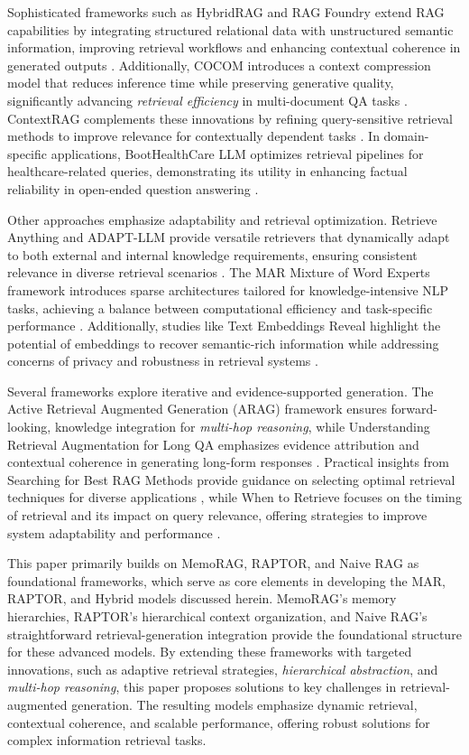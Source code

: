 \documentclass[pdflatex,sn-mathphys-num]{sn-jnl}%
\begin{document}
Sophisticated frameworks such as HybridRAG and RAG Foundry extend RAG capabilities by integrating structured relational data with unstructured semantic information, improving retrieval workflows and enhancing contextual coherence in generated outputs \cite{bib10, bib11}. Additionally, COCOM introduces a context compression model that reduces inference time while preserving generative quality, significantly advancing \emph{retrieval efficiency} in multi-document QA tasks \cite{bib12}. ContextRAG complements these innovations by refining query-sensitive retrieval methods to improve relevance for contextually dependent tasks \cite{bib13}. In domain-specific applications, BootHealthCare LLM optimizes retrieval pipelines for healthcare-related queries, demonstrating its utility in enhancing factual reliability in open-ended question answering \cite{bib19}.

Other approaches emphasize adaptability and retrieval optimization. Retrieve Anything and ADAPT-LLM provide versatile retrievers that dynamically adapt to both external and internal knowledge requirements, ensuring consistent relevance in diverse retrieval scenarios \cite{bib14, bib15}. The MAR Mixture of Word Experts framework introduces sparse architectures tailored for knowledge-intensive NLP tasks, achieving a balance between computational efficiency and task-specific performance \cite{bib20}. Additionally, studies like Text Embeddings Reveal highlight the potential of embeddings to recover semantic-rich information while addressing concerns of privacy and robustness in retrieval systems \cite{bib16}.

Several frameworks explore iterative and evidence-supported generation. The Active Retrieval Augmented Generation (ARAG) framework ensures forward-looking, knowledge integration for \emph{multi-hop reasoning}, while Understanding Retrieval Augmentation for Long QA emphasizes evidence attribution and contextual coherence in generating long-form responses \cite{bib17, bib18}. Practical insights from Searching for Best RAG Methods provide guidance on selecting optimal retrieval techniques for diverse applications \cite{bib21}, while When to Retrieve focuses on the timing of retrieval and its impact on query relevance, offering strategies to improve system adaptability and performance \cite{bib22}.

This paper primarily builds on MemoRAG, RAPTOR, and Naive RAG as foundational frameworks, which serve as core elements in developing the MAR, RAPTOR, and Hybrid models discussed herein. MemoRAG’s memory hierarchies, RAPTOR’s hierarchical context organization, and Naive RAG’s straightforward retrieval-generation integration provide the foundational structure for these advanced models. By extending these frameworks with targeted innovations, such as adaptive retrieval strategies, \emph{hierarchical abstraction}, and \emph{multi-hop reasoning}, this paper proposes solutions to key challenges in retrieval-augmented generation. The resulting models emphasize dynamic retrieval, contextual coherence, and scalable performance, offering robust solutions for complex information retrieval tasks.
\end{document}
